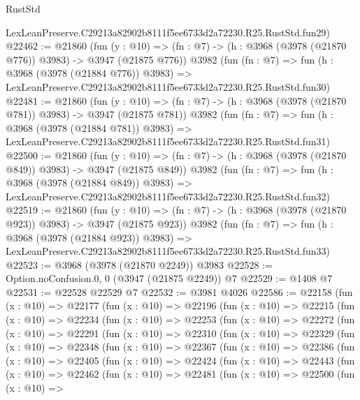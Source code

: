 \begin{lexlean}{RustStd}
\begin{coremodule}
    LexLeanPreserve.C29213a82902b8111f5ee6733d2a72230.R25.RustStd.fun29)
@22462 := @21860
    (fun (y : @10) => (fn : @7) -> (h : @3968 (@3978 (@21870 @776)) @3983) -> @3947 (@21875 @776))
    @3982
    (fun (fn : @7) =>
    fun (h : @3968 (@3978 (@21884 @776)) @3983) =>
    LexLeanPreserve.C29213a82902b8111f5ee6733d2a72230.R25.RustStd.fun30)
@22481 := @21860
    (fun (y : @10) => (fn : @7) -> (h : @3968 (@3978 (@21870 @781)) @3983) -> @3947 (@21875 @781))
    @3982
    (fun (fn : @7) =>
    fun (h : @3968 (@3978 (@21884 @781)) @3983) =>
    LexLeanPreserve.C29213a82902b8111f5ee6733d2a72230.R25.RustStd.fun31)
@22500 := @21860
    (fun (y : @10) => (fn : @7) -> (h : @3968 (@3978 (@21870 @849)) @3983) -> @3947 (@21875 @849))
    @3982
    (fun (fn : @7) =>
    fun (h : @3968 (@3978 (@21884 @849)) @3983) =>
    LexLeanPreserve.C29213a82902b8111f5ee6733d2a72230.R25.RustStd.fun32)
@22519 := @21860
    (fun (y : @10) => (fn : @7) -> (h : @3968 (@3978 (@21870 @923)) @3983) -> @3947 (@21875 @923))
    @3982
    (fun (fn : @7) =>
    fun (h : @3968 (@3978 (@21884 @923)) @3983) =>
    LexLeanPreserve.C29213a82902b8111f5ee6733d2a72230.R25.RustStd.fun33)
@22523 := @3968 (@3978 (@21870 @2249)) @3983
@22528 := Option.noConfusion.{0, 0} (@3947 (@21875 @2249)) @7
@22529 := @1408 @7
@22531 := @22528 @22529 @7
@22532 := @3981 @4026
@22586 := @22158
    (fun (x : @10) =>
    @22177
      (fun (x : @10) =>
      @22196
        (fun (x : @10) =>
        @22215
          (fun (x : @10) =>
          @22234
            (fun (x : @10) =>
            @22253
              (fun (x : @10) =>
              @22272
                (fun (x : @10) =>
                @22291
                  (fun (x : @10) =>
                  @22310
                    (fun (x : @10) =>
                    @22329
                      (fun (x : @10) =>
                      @22348
                        (fun (x : @10) =>
                        @22367
                          (fun (x : @10) =>
                          @22386
                            (fun (x : @10) =>
                            @22405
                              (fun (x : @10) =>
                              @22424
                                (fun (x : @10) =>
                                @22443
                                  (fun (x : @10) =>
                                  @22462
                                    (fun (x : @10) =>
                                    @22481
                                      (fun (x : @10) =>
                                      @22500
                                        (fun (x : @10) =>

\end{coremodule}
\end{lexlean}
